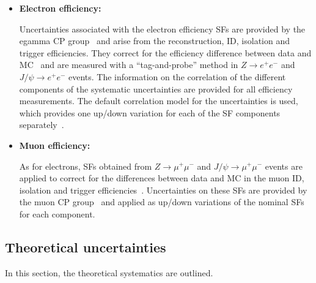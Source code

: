 \begin{itemize}
\item \textbf{Electron efficiency:}

Uncertainties associated with the electron efficiency SFs are provided by the egamma CP group~\cite{twiki-elSF} and arise from the reconstruction,
ID, isolation and trigger efficiencies. They correct for the efficiency difference between data and MC~\cite{EGAM-2018-01}
and are measured with a ``tag-and-probe'' method in $Z\rightarrow e^{+}e^{-}$ and $J/\psi \rightarrow e^{+}e^{-}$ events. The information on the correlation of the different components of the systematic uncertainties are provided for all efficiency  measurements. The default correlation model for the uncertainties is used, which provides one up/down variation
for each of the SF components separately~\cite{twiki-elSF,twiki-elSFunc}.


\item \textbf{Muon efficiency:}

As for electrons, SFs obtained from $Z\rightarrow \mu^{+}\mu^{-}$ and $J/\psi \rightarrow \mu^{+}\mu^{-}$ events are applied to correct for the differences between data and MC in the muon ID,
isolation and trigger efficiencies~\cite{MUON-2018-03}. Uncertainties on these SFs are provided by the muon
CP group~\cite{twiki-muSF} and applied as up/down variations of the nominal SFs for each component.


\end{itemize}

\subsection{Theoretical uncertainties}
\label{subsec:syst_theory}

In this section, the theoretical systematics are outlined.

